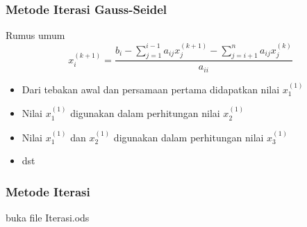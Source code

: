 \documentclass{beamer}
\begin{document}

\begin{frame}
\frametitle{Metode Iterasi Gauss-Seidel}
Rumus umum
\begin{equation}
x_i^{(k+1)}=\dfrac{b_i-\sum_{j=1}^{i-1}a_{ij}x_j^{(k+1)}-\sum_{j=i+1}^{n}a_{ij}x_j^{(k)}}{a_{ii}}
\nonumber
\end{equation}
\begin{itemize}
\item Dari tebakan awal dan persamaan pertama didapatkan nilai $x_1^{(1)}$
\item Nilai $x_1^{(1)}$ digunakan dalam perhitungan  nilai $x_2^{(1)}$
\item Nilai $x_1^{(1)}$ dan $x_2^{(1)}$ digunakan dalam perhitungan  nilai $x_3^{(1)}$
\item dst
\end{itemize}
\end{frame}


\begin{frame}
\frametitle{Metode Iterasi}
\begin{center}
buka file Iterasi.ods
\end{center}
\end{frame}
\end{document}
